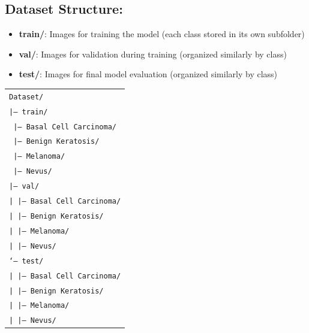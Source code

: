 \documentclass[a4paper,12pt]{report}
\begin{document}
\begin{spacing}{1.5}
    \subsection{Dataset Structure:}
    \begin{itemize}
        \item \textbf{train/}: Images for training the model (each class stored in its own subfolder)
        \item \textbf{val/}: Images for validation during training (organized similarly by class)
        \item \textbf{test/}: Images for final model evaluation (organized similarly by class)
    \end{itemize}
    
    \begin{center}
    \begin{tabular}{l}
    \texttt{Dataset/} \\
    \hspace{0.5cm}\texttt{|-- train/} \\
    \hspace{1cm}\texttt{   |-- Basal Cell Carcinoma/} \\
    \hspace{1cm}\texttt{   |-- Benign Keratosis/} \\
    \hspace{1cm}\texttt{   |-- Melanoma/} \\
    \hspace{1cm}\texttt{   |-- Nevus/} \\
    \hspace{0.5cm}\texttt{|-- val/} \\
    \hspace{1cm}\texttt{|   |-- Basal Cell Carcinoma/} \\
    \hspace{1cm}\texttt{|   |-- Benign Keratosis/} \\
    \hspace{1cm}\texttt{|   |-- Melanoma/} \\
    \hspace{1cm}\texttt{|   |-- Nevus/} \\
    \hspace{0.5cm}\texttt{`-- test/} \\
    \hspace{1cm}\texttt{|   |-- Basal Cell Carcinoma/} \\
    \hspace{1cm}\texttt{|   |-- Benign Keratosis/} \\
    \hspace{1cm}\texttt{|   |-- Melanoma/} \\
    \hspace{1cm}\texttt{|   |-- Nevus/} \\
    \end{tabular}
    \end{center}
    

\end{spacing}
\end{document}
